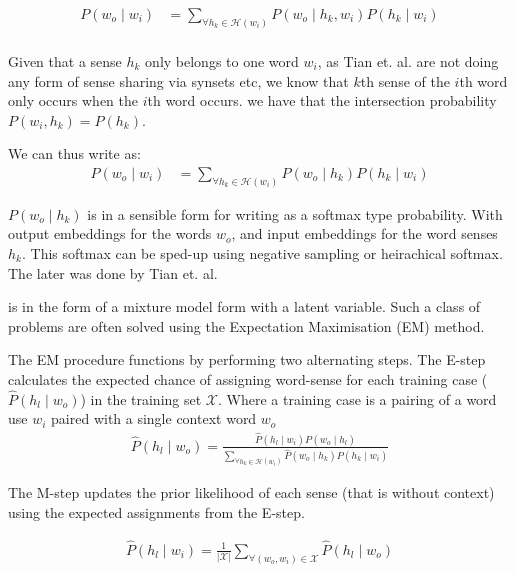 \documentclass[12pt,parskip]{komatufte}
\begin{document}
\begin{align}
	P(w_o\mid w_i) &= \sum_{\forall h_k \in \mathcal{H}(w_i)} P(w_o \mid h_k, w_i) P(h_k \mid w_i) \label{equ:tianmm} \\
\end{align}

Given that a sense $h_k$ only belongs to one word $w_i$, as Tian et. al. are not doing any form of sense sharing via synsets etc,
we know that $k$th sense of the $i$th word only occurs when the $i$th word occurs.
we have that the intersection probability $P(w_i,h_k) = P(h_k)$.

We can thus write  as:
\begin{align}
P(w_o\mid w_i) &= \sum_{\forall h_k \in \mathcal{H}(w_i)} P(w_o \mid h_k) P(h_k \mid w_i) \label{equ:tianmm2}
\end{align}

$P(w_o \mid h_k)$ is in a sensible form for writing as a softmax type probability.
With output embeddings for the words $w_o$, and input embeddings for the word senses $h_k$.
This softmax can be sped-up using negative sampling or heirachical softmax.
The later was done by Tian et. al.

 is in the form of a mixture model form with a latent variable.
Such a class of problems are often solved using the Expectation Maximisation (EM) method.

The EM procedure functions by performing two alternating steps.
The E-step calculates the expected chance of assigning word-sense for each training case ($\hat{P}(h_l \mid w_o)$) in the training set $\mathcal{X}$.
Where a training case is a pairing of a word use $w_i$ paired with a single context word $w_o$
\begin{align}
\hat{P}(h_l \mid w_o) = \frac{\hat{P}(h_l \mid w_i) P(w_o \mid h_l)}{\sum_{\forall h_k \in \mathcal{H}(w_i)} \hat{P}(w_o \mid h_k) P(h_k \mid w_i)}
\end{align}

The M-step updates the prior likelihood of each sense (that is without context) using the expected assignments from the E-step.

\begin{align}
\hat{P}(h_l \mid w_i) = \frac{1}{|\mathcal{X}|} \sum_{\forall (w_o,w_i)\in \mathcal{X}} \hat{P}(h_l \mid w_o)
\end{align}
\end{document}
